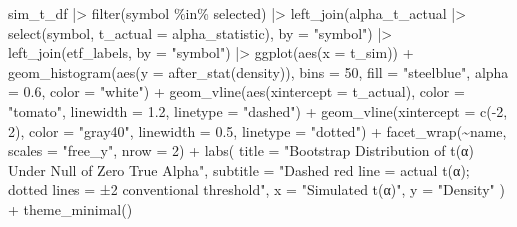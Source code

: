 \documentclass[
  letterpaper,
  DIV=11,
  numbers=noendperiod]{scrartcl}
\newenvironment{Shaded}{\begin{snugshade}}{\end{snugshade}}
\newcommand{\AttributeTok}[1]{\textcolor[rgb]{0.40,0.45,0.13}{#1}}
\newcommand{\DecValTok}[1]{\textcolor[rgb]{0.68,0.00,0.00}{#1}}
\newcommand{\FloatTok}[1]{\textcolor[rgb]{0.68,0.00,0.00}{#1}}
\newcommand{\FunctionTok}[1]{\textcolor[rgb]{0.28,0.35,0.67}{#1}}
\newcommand{\NormalTok}[1]{\textcolor[rgb]{0.00,0.23,0.31}{#1}}
\newcommand{\SpecialCharTok}[1]{\textcolor[rgb]{0.37,0.37,0.37}{#1}}
\newcommand{\StringTok}[1]{\textcolor[rgb]{0.13,0.47,0.30}{#1}}
\begin{document}
\begin{Shaded}
\begin{Highlighting}[]
\NormalTok{sim\_t\_df }\SpecialCharTok{|\textgreater{}}
  \FunctionTok{filter}\NormalTok{(symbol }\SpecialCharTok{\%in\%}\NormalTok{ selected) }\SpecialCharTok{|\textgreater{}}
  \FunctionTok{left\_join}\NormalTok{(alpha\_t\_actual }\SpecialCharTok{|\textgreater{}} \FunctionTok{select}\NormalTok{(symbol, }\AttributeTok{t\_actual =}\NormalTok{ alpha\_statistic), }\AttributeTok{by =} \StringTok{"symbol"}\NormalTok{) }\SpecialCharTok{|\textgreater{}}
  \FunctionTok{left\_join}\NormalTok{(etf\_labels, }\AttributeTok{by =} \StringTok{"symbol"}\NormalTok{) }\SpecialCharTok{|\textgreater{}}
  \FunctionTok{ggplot}\NormalTok{(}\FunctionTok{aes}\NormalTok{(}\AttributeTok{x =}\NormalTok{ t\_sim)) }\SpecialCharTok{+}
  \FunctionTok{geom\_histogram}\NormalTok{(}\FunctionTok{aes}\NormalTok{(}\AttributeTok{y =} \FunctionTok{after\_stat}\NormalTok{(density)), }\AttributeTok{bins =} \DecValTok{50}\NormalTok{,}
                 \AttributeTok{fill =} \StringTok{"steelblue"}\NormalTok{, }\AttributeTok{alpha =} \FloatTok{0.6}\NormalTok{, }\AttributeTok{color =} \StringTok{"white"}\NormalTok{) }\SpecialCharTok{+}
  \FunctionTok{geom\_vline}\NormalTok{(}\FunctionTok{aes}\NormalTok{(}\AttributeTok{xintercept =}\NormalTok{ t\_actual), }\AttributeTok{color =} \StringTok{"tomato"}\NormalTok{,}
             \AttributeTok{linewidth =} \FloatTok{1.2}\NormalTok{, }\AttributeTok{linetype =} \StringTok{"dashed"}\NormalTok{) }\SpecialCharTok{+}
  \FunctionTok{geom\_vline}\NormalTok{(}\AttributeTok{xintercept =} \FunctionTok{c}\NormalTok{(}\SpecialCharTok{{-}}\DecValTok{2}\NormalTok{, }\DecValTok{2}\NormalTok{), }\AttributeTok{color =} \StringTok{"gray40"}\NormalTok{,}
             \AttributeTok{linewidth =} \FloatTok{0.5}\NormalTok{, }\AttributeTok{linetype =} \StringTok{"dotted"}\NormalTok{) }\SpecialCharTok{+}
  \FunctionTok{facet\_wrap}\NormalTok{(}\SpecialCharTok{\textasciitilde{}}\NormalTok{name, }\AttributeTok{scales =} \StringTok{"free\_y"}\NormalTok{, }\AttributeTok{nrow =} \DecValTok{2}\NormalTok{) }\SpecialCharTok{+}
  \FunctionTok{labs}\NormalTok{(}
    \AttributeTok{title    =} \StringTok{"Bootstrap Distribution of t(α) Under Null of Zero True Alpha"}\NormalTok{,}
    \AttributeTok{subtitle =} \StringTok{"Dashed red line = actual t(α); dotted lines = ±2 conventional threshold"}\NormalTok{,}
    \AttributeTok{x        =} \StringTok{"Simulated t(α)"}\NormalTok{,}
    \AttributeTok{y        =} \StringTok{"Density"}
\NormalTok{  ) }\SpecialCharTok{+}
  \FunctionTok{theme\_minimal}\NormalTok{()}
\end{Highlighting}
\end{Shaded}
\end{document}
